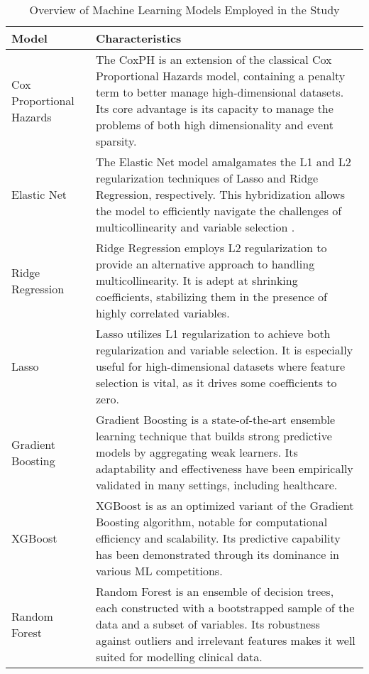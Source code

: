 \documentclass{article}
\begin{document}
\begin{table}[htb]
    \centering
    \caption{Overview of Machine Learning Models Employed in the Study}
    \begin{tabularx}{\textwidth}{lX}
    \toprule
    Model & Characteristics \\
    \midrule
    Cox Proportional Hazards \cite{tibshirani1997} & The CoxPH is an extension of the classical Cox Proportional Hazards model, containing a penalty term to better manage high-dimensional datasets. Its core advantage is its capacity to manage the problems of  both high dimensionality and event sparsity.\\
    \addlinespace
    Elastic Net \cite{zou2005} & The Elastic Net model amalgamates the L1 and L2 regularization techniques of Lasso and Ridge Regression, respectively. This hybridization allows the model to efficiently navigate the challenges of multicollinearity and variable selection . \\
    \addlinespace
    Ridge Regression \cite{hoerl1970} & Ridge Regression employs L2 regularization to provide an alternative approach to handling multicollinearity. It is adept at shrinking coefficients,  stabilizing them in the presence of highly correlated variables. \\
    \addlinespace
    Lasso \cite{tibshirani1996} & Lasso utilizes L1 regularization to achieve both regularization and variable selection. It is especially useful for high-dimensional datasets where feature selection is vital, as it drives some coefficients to zero. \\
    \addlinespace
    Gradient Boosting \cite{friedman2001} & Gradient Boosting is a state-of-the-art ensemble learning technique that builds strong predictive models by aggregating weak learners. Its adaptability and effectiveness have been empirically validated in many settings, including healthcare. \\
    \addlinespace
    XGBoost \cite{chen2016} & XGBoost is as an optimized variant of the Gradient Boosting algorithm, notable for computational efficiency and scalability. Its predictive capability has been demonstrated through its dominance in various ML competitions. \\
    \addlinespace
    Random Forest \cite{breiman2001} & Random Forest is an ensemble of decision trees, each constructed with a bootstrapped sample of the data and a subset of variables. Its robustness against outliers and irrelevant features makes it well suited for modelling clinical data. \\
    \bottomrule
    \end{tabularx}
    \label{tab:alg}
\end{table}
\end{document}
